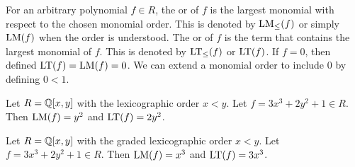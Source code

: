 For an arbitrary polynomial $f \in R$,
the  or  of $f$ is the largest monomial with respect to the chosen monomial order.
This is denoted by $\operatorname{LM}_\leq(f)$ or simply $\operatorname{LM}(f)$ when the order is understood.
The  or  of $f$ is the term that contains the largest monomial of $f$.
This is denoted by $\operatorname{LT}_\leq(f)$ or $\operatorname{LT}(f)$.
If $f = 0$, then defined $\operatorname{LT}(f) = \operatorname{LM}(f) = 0$.
We can extend a monomial order to include 0 by defining $0 < 1$.

\begin{example}
  Let $R = \mathbb{Q}[x,y]$ with the lexicographic order $x < y$.
  Let $f = 3x^3 + 2y^2 + 1 \in R$.
  Then $\operatorname{LM}(f) = y^2$ and $\operatorname{LT}(f) = 2y^2$.
\end{example}
\begin{example}
  Let $R = \mathbb{Q}[x,y]$ with the graded lexicographic order $x < y$.
  Let $f = 3x^3 + 2y^2 + 1 \in R$.
  Then $\operatorname{LM}(f) = x^3$ and $\operatorname{LT}(f) = 3x^3$.
\end{example}

